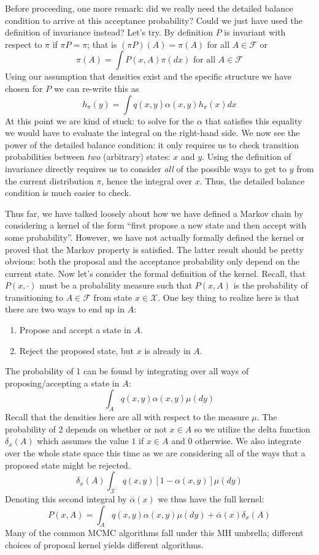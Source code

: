 \documentclass[12pt]{article}
\begin{document}
Before proceeding, one more remark: did we really need the detailed balance condition to arrive at this acceptance probability? Could we just have used the definition of invariance instead?
Let's try. By definition $P$ is invariant with respect to $\pi$ if $\pi P = \pi$; that is $(\pi P)(A) = \pi(A)$ for all $A \in \mathcal{F}$ or 
\[\pi(A) = \int P(x, A) \pi(dx) \text{ for all } A \in \mathcal{F}\]
Using our assumption that densities exist and the specific structure we have chosen for $P$ we can re-write this as
\[h_\pi(y) = \int q(x, y) \alpha(x, y) h_\pi(x) dx\]
At this point we are kind of stuck: to solve for the $\alpha$ that satisfies this equality we would have to evaluate the integral on the right-hand side. We now see the power 
of the detailed balance condition: it only requires us to check transition probabilities between \textit{two} (arbitrary) states: $x$ and $y$. Using the definition of invariance
directly requires us to consider \textit{all} of the possible ways to get to $y$ from the current distribution $\pi$, hence the integral over $x$. Thus, the detailed balance condition
is much easier to check. 

\bigskip

Thus far, we have talked loosely about how we have defined a Markov chain by considering a kernel of the form ``first propose a new state and then accept with some 
probability''. However, we have not actually formally defined the kernel or proved that the Markov property is satisfied. The latter result should be pretty obvious: both the 
proposal and the acceptance probability only depend on the current state. Now let's consider the formal definition of the kernel. Recall, that $P(x, \cdot)$ must be a probability 
measure such that $P(x, A)$ is the probability of transitioning to $A \in \mathcal{F}$ from state $x \in \mathcal{X}$. One key thing to realize here is that there are two ways 
to end up in $A$: 
\begin{enumerate} 
\item Propose and accept a state in $A$. 
\item Reject the proposed state, but $x$ is already in $A$. 
\end{enumerate}
The probability of 1 can be found by integrating over all ways of proposing/accepting a state in $A$: 
\[\int_{A} q(x, y)\alpha(x, y)\mu(dy)\]
Recall that the densities here are all with respect to the measure $\mu$. The probability of 2 depends on whether or not $x \in A$ so we utilize the delta function 
$\delta_x(A)$ which assumes the value $1$ if $x \in A$ and $0$ otherwise. We also integrate over the whole state space this time as we are considering all of the ways
that a proposed state might be rejected. 
\[\delta_x(A)\int_\mathcal{X} q(x, y)[1 - \alpha(x, y)]\mu(dy)\]
Denoting this second integral by $\overline{\alpha}(x)$ we thus have the full kernel: 
\[P(x, A) = \int_{A} q(x, y)\alpha(x, y)\mu(dy) + \overline{\alpha}(x) \delta_x(A)\]
Many of the common MCMC algorithms fall under this MH umbrella; different choices of proposal kernel yields different algorithms.
\end{document}
